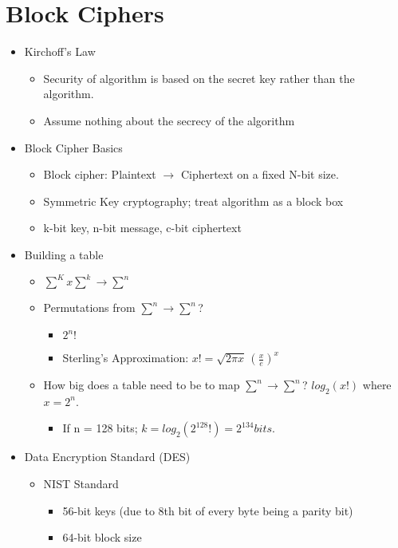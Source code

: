 \section{Block Ciphers}
\begin{itemize}
\item Kirchoff's Law
    \begin{itemize}
    \item Security of algorithm is based on the secret key rather than the algorithm.
    \item Assume nothing about the secrecy of the algorithm
    \end{itemize}
\item Block Cipher Basics
    \begin{itemize}
    \item Block cipher: Plaintext $\rightarrow$ Ciphertext on a fixed N-bit size. 
    \item Symmetric Key cryptography; treat algorithm as a block box
    \item k-bit key, n-bit message, c-bit ciphertext
    \end{itemize}
\item Building a table
    \begin{itemize}
    \item $\sum^K x \sum^k \rightarrow \sum^n$
    \item Permutations from $\sum^n \rightarrow \sum^n$?
        \begin{itemize}
        \item $2^n!$
        \item Sterling's Approximation: $x! = \sqrt{2\pi x}\,(\frac{x}{e})^x $
        \end{itemize}
    \item How big does a table need to be to map $\sum^n \rightarrow \sum^n$? $log_2(x!)$ where $x = 2^n$.
        \begin{itemize}
        \item If n = 128 bits; $k = log_2(2^{128}!) = 2^{134} bits.$
        \end{itemize}
    \end{itemize}
\item Data Encryption Standard (DES)
    \begin{itemize}
    \item NIST Standard
        \begin{itemize}
        \item 56-bit keys (due to 8th bit of every byte being a parity bit)
        \item 64-bit block size

\end{itemize}
\end{itemize}
\end{itemize}
